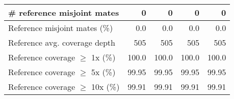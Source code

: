 \documentclass[12pt,a4paper]{article}
\begin{document}
\begin{table}[ht]
\begin{center}
\begin{tabular}{|l*{4}{|r}|}
\# reference misjoint mates & 0 & 0 & 0 & 0 \\ \hline
Reference misjoint mates (\%) & 0.0 & 0.0 & 0.0 & 0.0 \\ \hline
Reference avg. coverage depth & 505 & 505 & 505 & 505 \\ \hline
Reference coverage $\geq$ 1x (\%) & 100.0 & 100.0 & 100.0 & 100.0 \\ \hline
Reference coverage $\geq$ 5x (\%) & 99.95 & 99.95 & 99.95 & 99.95 \\ \hline
Reference coverage $\geq$ 10x (\%) & 99.91 & 99.91 & 99.91 & 99.91 \\ \hline
\end{tabular}
\end{center}
\end{table}
\end{document}
